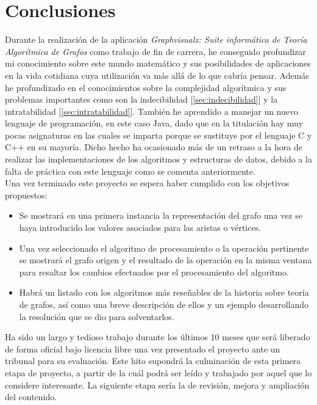 \chapter{Conclusiones}
\label{chap:conclusiones}

Durante la realización de la aplicación \emph{Graphvisualx: Suite informática de Teoría Algorítmica de Grafos} como trabajo de fin de carrera, he conseguido profundizar mi conocimiento sobre este mundo matemático y sus posibilidades de aplicaciones en la vida cotidiana cuya utilización va más allá de lo que cabría pensar. Además he profundizado en el conocimientos sobre la complejidad algorítmica y sus problemas importantes como son la indecibilidad [\ref{sec:indecibilidad}] y la intratabilidad [\ref{sec:intratabilidad}]. También he aprendido a manejar un nuevo lenguaje de programación, en este caso Java, dado que en la titulación hay muy pocas asignaturas en las cuales se imparta porque se sustituye por el lenguaje C y C++ en su mayoría. Dicho hecho ha ocasionado más de un retraso a la hora de realizar las implementaciones de los algoritmos y estructuras de datos, debido a la falta de práctica con este lenguaje como se comenta anteriormente.\\

Una vez terminado este proyecto se espera haber cumplido con los objetivos propuestos:
\begin{itemize}
\item Se mostrará en una primera instancia la representación del grafo una vez se haya introducido los valores asociados para las aristas o vértices.

\item Una vez seleccionado el algoritmo de procesamiento o la operación pertinente se mostrará el grafo origen y el resultado de la operación en la misma ventana para resaltar los cambios efectuados por el procesamiento del algoritmo.

\item Habrá un listado con los algoritmos más reseñables de la historia sobre teoría de grafos, así como una breve descripción de ellos y un ejemplo desarrollando la resolución que se dio para solventarlos. 

\end{itemize}

Ha sido un largo y tedioso trabajo durante los últimos 10 meses que será liberado de forma oficial bajo licencia libre una vez presentado el proyecto ante un tribunal para su evaluación. Este hito supondrá la culminación de esta primera etapa de proyecto, a partir de la cuál podrá ser leído y trabajado por aquel que lo considere interesante. La siguiente etapa sería la de revisión, mejora y ampliación del contenido.\\

